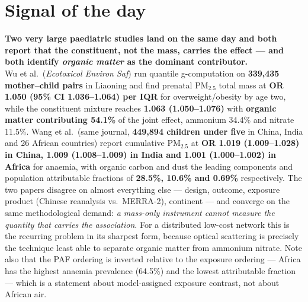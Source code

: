 \documentclass[10pt]{article}
\begin{document}
\vspace{6mm}

\section*{\sffamily\bfseries\color{Deep}Signal of the day}
\vspace{-1.5mm}{\color{Amber}\rule{\linewidth}{1.1pt}}\vspace{2.5mm}

\begin{keybox}
{\sffamily\bfseries\small\color{Deep}Two very large paediatric studies land on the same day
and both report that the constituent, not the mass, carries the effect --- and both
identify \emph{organic matter} as the dominant contributor.}\\[1.4mm]
\footnotesize
Wu et al.\ (\textit{Ecotoxicol Environ Saf}) run quantile g-computation on
\textbf{339{,}435 mother--child pairs} in Liaoning and find prenatal PM$_{2.5}$ total mass
at \textbf{OR 1.050 (95\% CI 1.036--1.064) per IQR} for overweight/obesity by age two,
while the constituent mixture reaches \textbf{1.063 (1.050--1.076)} with
\textbf{organic matter contributing 54.1\%} of the joint effect, ammonium 34.4\% and
nitrate 11.5\%. Wang et al.\ (same journal, \textbf{449{,}894 children under five} in
China, India and 26 African countries) report cumulative PM$_{2.5}$ at
\textbf{OR 1.019 (1.009--1.028) in China, 1.009 (1.008--1.009) in India and
1.001 (1.000--1.002) in Africa} for anaemia, with organic carbon and dust the leading
components and population attributable fractions of \textbf{28.5\%, 10.6\% and 0.69\%}
respectively. The two papers disagree on almost everything else --- design, outcome,
exposure product (Chinese reanalysis vs.\ MERRA-2), continent --- and converge on the same
methodological demand: \emph{a mass-only instrument cannot measure the quantity that
carries the association}. For a distributed low-cost network this is the recurring problem
in its sharpest form, because optical scattering is precisely the technique least able to
separate organic matter from ammonium nitrate. Note also that the PAF ordering is inverted
relative to the exposure ordering --- Africa has the highest anaemia prevalence (64.5\%)
and the lowest attributable fraction --- which is a statement about model-assigned exposure
contrast, not about African air.
\end{keybox}

\vspace{3mm}
\end{document}
